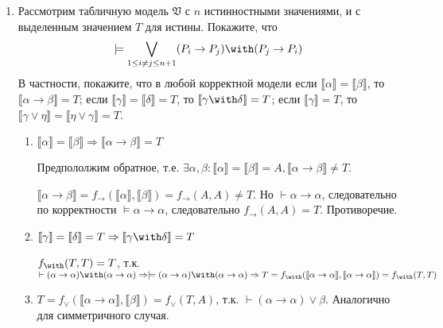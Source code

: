 

\cfoot{}



\begin{enumerate}[wide, labelwidth=!, labelindent=0pt]
    \item Рассмотрим табличную модель $\mathfrak{V}$ с $n$ истинностными значениями,
          и с выделенным значением $T$ для истины.
          Покажите, что $$\models\bigvee_{1 \le i\ne j \le n+1} (P_i \rightarrow P_j)\with(P_j\rightarrow P_i)$$
          В частности, покажите, что в любой корректной модели если $\llbracket\alpha\rrbracket = \llbracket\beta\rrbracket$, то
          $\llbracket\alpha\rightarrow\beta\rrbracket = T$; если $\llbracket\gamma\rrbracket = \llbracket\delta\rrbracket = T$, то
          $\llbracket\gamma\with\delta\rrbracket = T$;
          если $\llbracket\gamma\rrbracket = T$, то $\llbracket\gamma\vee\eta\rrbracket = \llbracket\eta\vee\gamma\rrbracket = T$.

          \begin{enumerate}
              \item \(\llbracket\alpha\rrbracket = \llbracket\beta\rrbracket \Rightarrow \llbracket\alpha\rightarrow\beta\rrbracket = T\)

                    Предпололжим обратное, т.е. \(\exists \alpha, \beta : \llbracket \alpha \rrbracket = \llbracket \beta \rrbracket = A, \llbracket \alpha \to \beta \rrbracket \neq T\).

                    \(\llbracket \alpha \to \beta \rrbracket = f_\to (\llbracket \alpha \rrbracket, \llbracket \beta \rrbracket) = f_{\to}(A, A) \neq T\). Но \(\vdash \alpha \to \alpha\), следовательно по корректности \(\models \alpha \to \alpha\), следовательно \(f_\to (A, A) = T\). Противоречие.

              \item \(\llbracket\gamma\rrbracket = \llbracket\delta\rrbracket = T \Rightarrow \llbracket\gamma\with\delta\rrbracket = T\)

                    \(f_{\with}(T, T) = T\), т.к. \(\vdash (\alpha \to \alpha) \with (\alpha \to \alpha) \Rightarrow \models (\alpha \to \alpha) \with (\alpha \to \alpha) \Rightarrow T = f_{\with}(\llbracket \alpha \to \alpha \rrbracket, \llbracket \alpha \to \alpha \rrbracket) = f_\with (T, T)\)

              \item \(T = f_\lor(\llbracket \alpha \to \alpha \rrbracket, \llbracket \beta \rrbracket) = f_\lor(T, A)\), т.к. \(\vdash (\alpha \to \alpha) \lor \beta\). Аналогично для симметричного случая.
          \end{enumerate}


\end{enumerate}
